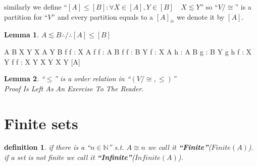 \documentclass[10pt,a4paper]{book}
\newtheorem{definition}{definition}[section]
\newtheorem{lemma}{Lemma}[section]
\begin{document}
similarly we define ``$[A] \leq [B] : \forall X \in [A] , Y \in [B] \quad X
\lesssim Y$''
so ``$ V / \cong $'' is a partition for ``$V$'' and every partition equals to a
$[A]_{\cong}$ we denote it by $[A]$.




\begin{lemma} $A \lesssim  B \therefore / \therefore [A] \leq  [B] $\\
 
\end{lemma}

\begin{fitchproof}[arrayenv=tabular]
     {  A \lesssim  B   }
    \open
     {  X \in [A]}
     {  Y \in [B]}
     {  X \cong A }
     {  Y \cong B }
     {  \exists f \quad f : X  A }         
     {  \exists f \quad f : A  B }         
     {  \exists f \quad f : B  Y }         
    \open
     {  f : X  A }         
    \open
     {   h : A  B }         
    \open
     {  g : B  Y }         
     {  g \circ h \circ f : X  Y }         
     {  \exists f \quad f : X  Y }         
     {  X \lesssim  Y   }                                
    \close
    \close
    \close
     {  X \lesssim  Y   }                                    
    \close
     {  [A] \leq  [B] }
\end{fitchproof}


\begin{lemma} ``$\leq$'' is a order relation in ``$(V / \cong , \leq)$''\\
    Proof Is Left As An Exercise To The Reader.
\end{lemma}




\section{Finite sets}

\begin{definition} if there is a ``$n \in \mathbb{N}$'' s.t. $ A \cong n$ we call it \textbf{``Finite''}($Finite(A)$).
    if a set is not finite we call it \textbf{``Infinite''}($Infinite(A)$).
\end{definition}
\end{document}
